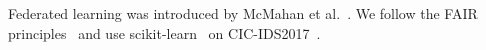Federated learning was introduced by McMahan et al.~\cite{mcmahan2017communication}.
We follow the FAIR principles~\cite{wilkinson2016fair} and use
scikit-learn~\cite{pedregosa2011sklearn} on CIC-IDS2017~\cite{cicids2017}.


